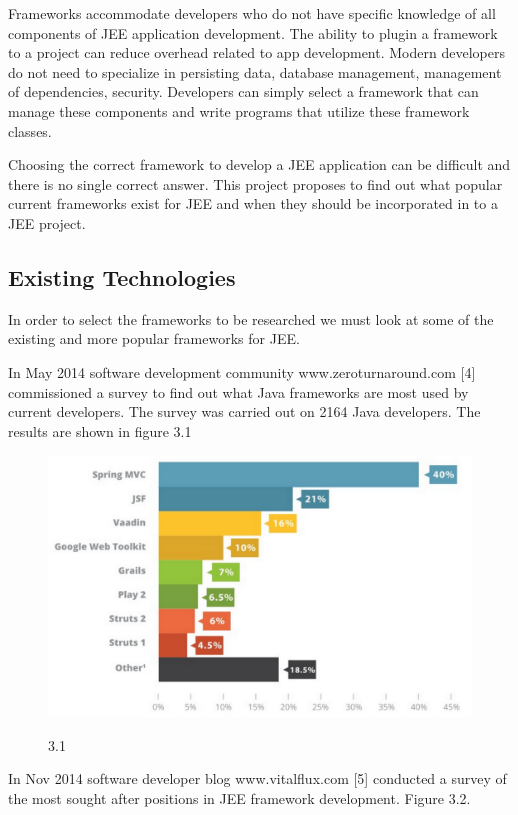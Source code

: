\documentclass[]{report}
\begin{document}
	Frameworks accommodate developers who do not have specific knowledge of all components of JEE application development. The ability to plugin a framework to a project can reduce overhead related to app development. Modern developers do not need to specialize in persisting data, database management, management of dependencies, security. Developers can simply select a framework that can manage these components and write programs that utilize these framework classes.
	
	Choosing the correct framework to develop a JEE application can be difficult and there is no single correct answer. This project proposes to find out what popular current frameworks exist for JEE and when they should be incorporated in to a JEE project. 
		
\newpage
		
	\subsection{Existing Technologies}
	In order to select the frameworks to be researched we must look at some of the existing and more popular frameworks for JEE. 
	
	In May 2014 software development community www.zeroturnaround.com [4] commissioned a survey to find out what Java frameworks are most used by current developers. The survey was carried out on 2164 Java developers. The results are shown in figure 3.1
	
		\begin{figure}[h]
			\includegraphics[width=.7\textwidth]{img1.png}
			\begin{center}
			\figurename{ 3.1}
			\end{center}
		\end{figure}
		
		In Nov 2014 software developer blog www.vitalflux.com [5] conducted a survey of the most sought after positions in JEE framework development. Figure 3.2.			
\end{document}
